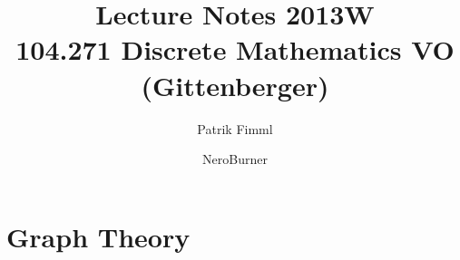\documentclass[10pt,a4paper,titlepage,oneside,final]{book}
\author{Patrik Fimml\and NeroBurner}
\title{Lecture Notes 2013W\\ 104.271 Discrete Mathematics VO\\ (Gittenberger)}
\theoremstyle{custom}
\begin{document}
\def\dt#1{\textbf{#1}}

\def\remark{\noindent \textbf{Remark.}}



\maketitle
\tableofcontents


\chapter{Graph Theory}


%

\printindex
\end{document}
